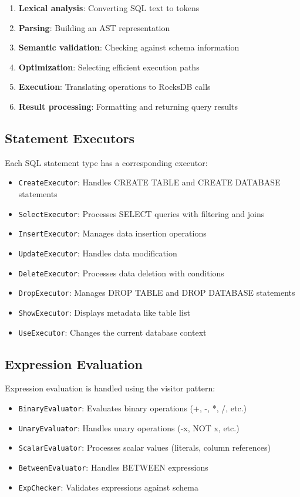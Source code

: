 \documentclass[12pt,a4paper]{article}
\begin{document}
\begin{enumerate}
    \item \textbf{Lexical analysis}: Converting SQL text to tokens
    \item \textbf{Parsing}: Building an AST representation
    \item \textbf{Semantic validation}: Checking against schema information
    \item \textbf{Optimization}: Selecting efficient execution paths
    \item \textbf{Execution}: Translating operations to RocksDB calls
    \item \textbf{Result processing}: Formatting and returning query results
\end{enumerate}

\subsection{Statement Executors}
Each SQL statement type has a corresponding executor:

\begin{itemize}
    \item \texttt{CreateExecutor}: Handles CREATE TABLE and CREATE DATABASE statements
    \item \texttt{SelectExecutor}: Processes SELECT queries with filtering and joins
    \item \texttt{InsertExecutor}: Manages data insertion operations
    \item \texttt{UpdateExecutor}: Handles data modification
    \item \texttt{DeleteExecutor}: Processes data deletion with conditions
    \item \texttt{DropExecutor}: Manages DROP TABLE and DROP DATABASE statements
    \item \texttt{ShowExecutor}: Displays metadata like table list
    \item \texttt{UseExecutor}: Changes the current database context
\end{itemize}

\subsection{Expression Evaluation}
Expression evaluation is handled using the visitor pattern:

\begin{itemize}
    \item \texttt{BinaryEvaluator}: Evaluates binary operations (+, -, *, /, etc.)
    \item \texttt{UnaryEvaluator}: Handles unary operations (-x, NOT x, etc.)
    \item \texttt{ScalarEvaluator}: Processes scalar values (literals, column references)
    \item \texttt{BetweenEvaluator}: Handles BETWEEN expressions
    \item \texttt{ExpChecker}: Validates expressions against schema
\end{itemize}
\end{document}
